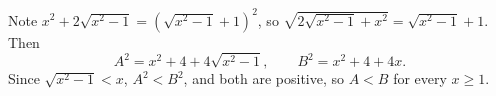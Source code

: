 Note $x^2+2\sqrt{x^2-1}=\left(\sqrt{x^2-1}+1\right)^2$, so $\sqrt{2\sqrt{x^2-1}+x^2}=\sqrt{x^2-1}+1$. Then
\[A^2=x^2+4+4\sqrt{x^2-1},\qquad B^2=x^2+4+4x.\]
Since $\sqrt{x^2-1}<x$, $A^2<B^2$, and both are positive, so $\boxed{A<B}$ for every $x\ge1$.
